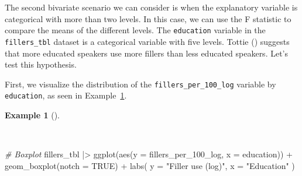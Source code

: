 \documentclass[
  letterpaper,
]{latex/krantz}
\newenvironment{Shaded}{\begin{snugshade}}{\end{snugshade}}
\newcommand{\AttributeTok}[1]{\textcolor[rgb]{0.00,0.00,0.00}{#1}}
\newcommand{\CommentTok}[1]{\textcolor[rgb]{0.00,0.00,0.00}{\textit{#1}}}
\newcommand{\ConstantTok}[1]{\textcolor[rgb]{0.00,0.00,0.00}{#1}}
\newcommand{\FunctionTok}[1]{\textcolor[rgb]{0.00,0.00,0.00}{#1}}
\newcommand{\NormalTok}[1]{\textcolor[rgb]{0.00,0.00,0.00}{#1}}
\newcommand{\SpecialCharTok}[1]{\textcolor[rgb]{0.00,0.00,0.00}{#1}}
\newcommand{\StringTok}[1]{\textcolor[rgb]{0.00,0.00,0.00}{#1}}
\theoremstyle{definition}
\newtheorem{example}{Example}[chapter]
\theoremstyle{remark}
\begin{document}
The second bivariate scenario we can consider is when the explanatory
variable is categorical with more than two levels. In this case, we can
use the F statistic to compare the means of the different levels. The
\texttt{education} variable in the \texttt{fillers\_tbl} dataset is a
categorical variable with five levels. Tottie
() suggests that more educated speakers
use more fillers than less educated speakers. Let's test this
hypothesis.

First, we visualize the distribution of the
\texttt{fillers\_per\_100\_log} variable by \texttt{education}, as seen
in Example~\ref{exm-ida-num-bi-edu-vis}.

\begin{example}[]\protect\hypertarget{exm-ida-num-bi-edu-vis}{}\label{exm-ida-num-bi-edu-vis}

~

\begin{Shaded}
\begin{Highlighting}[]
\CommentTok{\# Boxplot}
\NormalTok{fillers\_tbl }\SpecialCharTok{|\textgreater{}}
  \FunctionTok{ggplot}\NormalTok{(}\FunctionTok{aes}\NormalTok{(}\AttributeTok{y =}\NormalTok{ fillers\_per\_100\_log, }\AttributeTok{x =}\NormalTok{ education)) }\SpecialCharTok{+}
  \FunctionTok{geom\_boxplot}\NormalTok{(}\AttributeTok{notch =} \ConstantTok{TRUE}\NormalTok{) }\SpecialCharTok{+}
  \FunctionTok{labs}\NormalTok{(}
    \AttributeTok{y =} \StringTok{"Filler use (log)"}\NormalTok{,}
    \AttributeTok{x =} \StringTok{"Education"}
\NormalTok{  )}
\end{Highlighting}
\end{Shaded}

\begin{figure}[H]

\end{figure}
\end{example}
\end{document}
